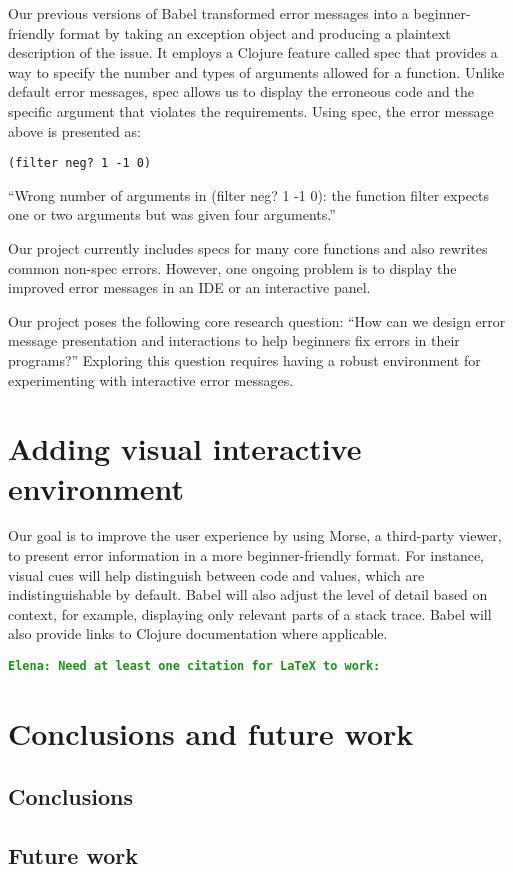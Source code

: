 \documentclass[12pt]{article}
\newcommand{\comment}[1]{{\bf \tt  {#1}}}
\newcommand{\emcomment}[1]{\textcolor{ForestGreen}{\comment{Elena: {#1}}}}
\begin{document}
Our previous versions of Babel transformed error messages into a beginner-friendly format by taking an exception object and producing a plaintext description of the issue. It employs a Clojure feature called spec that provides a way to specify the number and types of arguments allowed for a function. Unlike default error messages, spec allows us to display the erroneous code and the specific argument that violates the requirements. Using spec, the error message above is presented as: 
\begin{verbatim}
(filter neg? 1 -1 0)
\end{verbatim}
``Wrong number of arguments in (filter neg? 1 -1 0): the function filter expects one or two arguments but was given four arguments.''

Our project currently includes specs for many core functions and also rewrites common non-spec errors. However, one ongoing problem is to display the improved error messages in an IDE or an interactive panel. 

Our project poses the following core research question: ``How can we design error message presentation and interactions to help beginners fix errors in their programs?'' Exploring this question requires having a robust environment for experimenting with interactive error messages.

\section{Adding visual interactive environment}\label{sec:current}
Our goal is to improve the user experience by using Morse, a third-party viewer, to present error information in a more beginner-friendly format. For instance, visual cues will help distinguish between code and values, which are indistinguishable by default. Babel will also adjust the level of detail based on context, for example, displaying only relevant parts of a stack trace. Babel will also provide links to Clojure documentation where applicable.



\emcomment{Need at least one citation for LaTeX to work:}
\cite{Hickey:2008}

		
\section{Conclusions and future work}\label{sec:conclusion}
	\subsection{Conclusions}
	

	\subsection{Future work}



\end{document}
